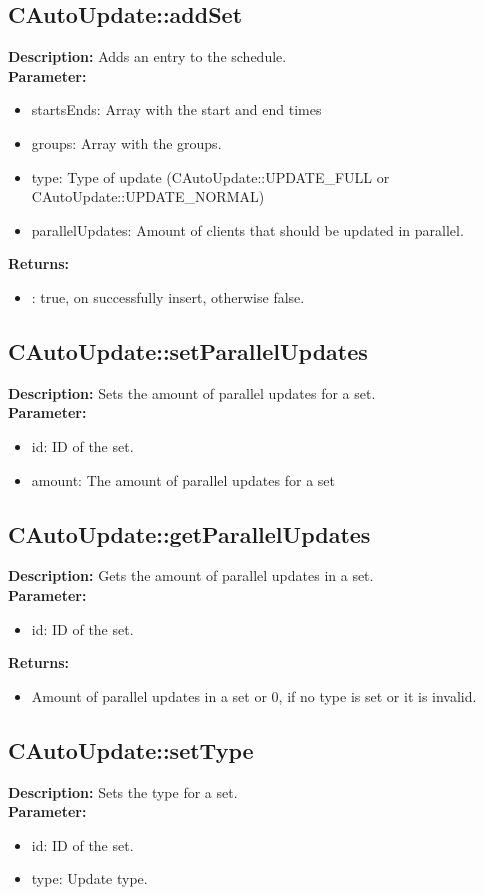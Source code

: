 \subsection{CAutoUpdate::addSet}
\textbf{Description:} Adds an entry to the schedule.\\
\textbf{Parameter:}
\begin{itemize}
\item startsEnds: Array with the start and end times
\item groups: Array with the groups.
\item type: Type of update (CAutoUpdate::UPDATE\_FULL or CAutoUpdate::UPDATE\_NORMAL)
\item parallelUpdates: Amount of clients that should be updated in parallel.
\end{itemize}
\textbf{Returns:}
\begin{itemize}
\item : true, on successfully insert, otherwise false.
\end{itemize}

\subsection{CAutoUpdate::setParallelUpdates}
\textbf{Description:} Sets the amount of parallel updates for a set.\\
\textbf{Parameter:}
\begin{itemize}
\item id: ID of the set.
\item amount: The amount of parallel updates for a set
\end{itemize}

\subsection{CAutoUpdate::getParallelUpdates}
\textbf{Description:} Gets the amount of parallel updates in a set.\\
\textbf{Parameter:}
\begin{itemize}
\item id: ID of the set.
\end{itemize}
\textbf{Returns:}
\begin{itemize}
\item Amount of parallel updates in a set or 0, if no type is set or it is invalid.
\end{itemize}

\subsection{CAutoUpdate::setType}
\textbf{Description:} Sets the type for a set.\\
\textbf{Parameter:}
\begin{itemize}
\item id: ID of the set.
\item type: Update type.
\end{itemize}

